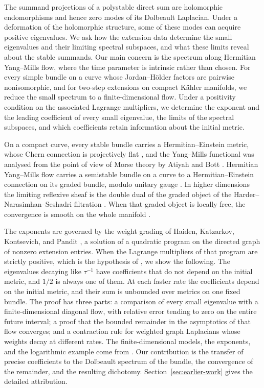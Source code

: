 \documentclass[11pt]{amsart}
\theoremstyle{definition}
\theoremstyle{remark}
\begin{document}
The summand projections of a polystable direct sum are holomorphic
endomorphisms and hence zero modes of its Dolbeault Laplacian. Under a
deformation of the holomorphic structure, some of these modes can acquire
positive eigenvalues. We ask how the extension data determine the small
eigenvalues and their limiting spectral subspaces, and what these limits
reveal about the stable summands. Our main concern is the spectrum along
Hermitian Yang--Mills flow, where the time parameter is intrinsic rather than
chosen.
For every simple bundle on a curve whose Jordan--H\"older factors are
pairwise nonisomorphic, and for two-step extensions on compact K\"ahler
manifolds, we reduce the small spectrum to a finite-dimensional flow. Under
a positivity condition on the associated Lagrange multipliers, we determine
the exponent and the leading coefficient of every small eigenvalue, the
limits of the spectral subspaces, and which coefficients retain information
about the initial metric.

On a compact curve, every stable bundle carries a Hermitian--Einstein
metric, whose Chern connection is projectively flat
\cite{NarasimhanSeshadri1965,Donaldson1983}, and the Yang--Mills
functional was analysed from the point of view of Morse theory by
Atiyah and Bott \cite{AtiyahBott1983}. Hermitian Yang--Mills flow
\cite{Donaldson1985,Simpson1988} carries a semistable bundle on a curve
to a Hermitian--Einstein connection on its graded bundle, modulo unitary
gauge \cite{Daskalopoulos1992,Rade1992}. In higher dimensions the
limiting reflexive sheaf is the double dual of the graded object of the
Harder--Narasimhan--Seshadri filtration
\cite{DaskalopoulosWentworth2004,Jacob2015,Sibley2015}. When that graded
object is locally free, the convergence is smooth on the whole manifold
\cite{SibleyWentworth2015}.

The exponents are governed by the weight grading of Haiden, Katzarkov,
Kontsevich, and Pandit \cite{HKKP2023}, a solution of a quadratic program
on the directed graph of nonzero extension entries. When the Lagrange multipliers of that program are strictly positive,
which is the hypothesis of \cite[Theorem~3.6]{HKKP2023}, we show the
following. The eigenvalues decaying like $\tau^{-1}$ have coefficients that
do not depend on the initial metric, and $1/2$ is always one of them. At
each faster rate the coefficients depend on the initial metric, and their
sum is unbounded over metrics on one fixed bundle. The proof has three parts: a
comparison of every small eigenvalue with a finite-dimensional diagonal
flow, with relative error tending to zero on the entire future interval; a
proof that the bounded remainder in the asymptotics of that flow converges;
and a contraction rule for weighted graph Laplacians whose weights decay at
different rates. The finite-dimensional models, the exponents, and the
logarithmic example come from \cite{HKKP2023,HKKP2018}. Our contribution is
the transfer of precise coefficients to the Dolbeault spectrum of the
bundle, the convergence of the remainder, and the resulting dichotomy.
Section~\ref{sec:earlier-work} gives the detailed attribution.
\end{document}
